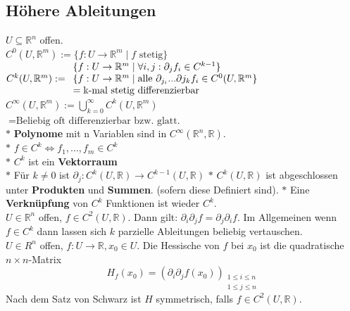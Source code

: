 \subsection{Höhere Ableitungen}
    \(U\subseteq\mathbb R^n\) offen.\\
    \(C^0(U,\mathbb R^m):=\{f:U\rightarrow\mathbb R^m\mid f \text{ stetig}\}\)\\
    \(C^k(U,\mathbb R^m):=\\
    \begin{array}{ll}\{f:U\rightarrow\mathbb R^m\mid \forall i,j:\partial_jf_i\in C^{k-1}\}\\
    \{f:U\rightarrow\mathbb R^m\mid\text{alle }\partial_{j_i}...\partial{j_k}f_i\in C^0(U,\mathbb R^m\}\\=\text{k-mal stetig differenzierbar}\end{array}\)
    \(C^\infty(U,\mathbb R^m):=\bigcup\limits_{k=0}^\infty C^k(U,\mathbb
    R^m)\)\\
    \(=\text{Beliebig oft differenzierbar bzw. glatt.}\)\\ 
    \(*\) \textbf{Polynome} mit n Variablen sind in \(C^\infty(\mathbb R^n,\mathbb R)\).\\
    \(*\) \(f\in C^k\iff f_1,...,f_m\in C^k\)\\
    \(*\) \(C^k\) ist ein \textbf{Vektorraum}\\
    \(*\) Für \(k\neq 0\) ist \(\partial_j: C^k(U,\mathbb R)\rightarrow
    C^{k-1}(U, \mathbb R)\)
    \(*\) \(C^k(U,\mathbb R)\) ist abgeschlossen unter \textbf{Produkten} und
    \textbf{Summen}.
    (sofern diese Definiert sind).
    \(*\) Eine \textbf{Verknüpfung} von \(C^k\) Funktionen ist wieder \(C^k\).\\
    \(U\in\mathbb R^n\) offen, \(f\in C^2(U,\mathbb R)\). Dann gilt:
    \(\partial_i\partial_jf=\partial_j\partial_if\).
    Im Allgemeinen wenn \(f\in C^k\) dann lassen sich \(k\) parzielle
    Ableitungen beliebig vertauschen.\\
    \(U\in R^n\) offen, \(f:U\rightarrow \mathbb R, x_0\in U\).
    Die Hessische von \(f\) bei \(x_0\) ist die quadratische \(n\times
    n\)-Matrix
    \[H_f(x_0)=(\partial_i\partial_j f(x_0))_{\substack{1\leq i\leq n\\ 1\leq
    j\leq n}}\]
    Nach dem Satz von Schwarz ist \(H\) symmetrisch, falls \(f\in C^2(U,\mathbb
    R)\).\\
